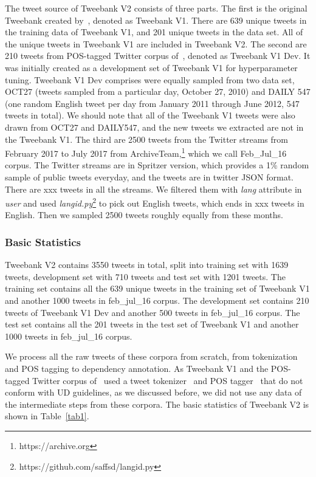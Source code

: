 \documentclass[11pt,letterpaper]{article}
\begin{document}
The tweet source of Tweebank V2 consists of three parts. 
The first is the original Tweebank created by~\cite{kong-EtAl:2014:EMNLP2014}, denoted as Tweebank V1.  There are 639 unique tweets in the training data of Tweebank V1, and 201 unique tweets in the data set. All of the unique tweets in Tweebank V1 are included in Tweebank V2.
The second are 210 tweets from POS-tagged Twitter corpus of~, denoted as Tweebank V1 Dev. It was initially created as a development set of Tweebank V1 for hyperparameter tuning.
Tweebank V1 Dev comprises were equally sampled from two data set, OCT27 (tweets sampled from a particular day, October 27, 2010) and DAILY 547 (one random English tweet per day from January 2011 through June 2012, 547 tweets in total). We should note that all of the Tweebank V1 tweets were also drawn from OCT27 and DAILY547, and the new tweets we extracted are not in the Tweebank V1.
The third are 2500 tweets from the Twitter streams from February 2017 to July 2017 from ArchiveTeam,\footnote{https://archive.org} which we call Feb\_Jul\_16 corpus. The Twitter streams are in Spritzer version, which provides a 1\% random sample of public tweets everyday, and the tweets are in twitter JSON format. 
There are xxx tweets in all the streams. We filtered them with \textit{lang} attribute in \textit{user} and used \textit{langid.py}\footnote{https://github.com/saffsd/langid.py} to pick out English tweets, which ends in xxx tweets in English. Then we sampled 2500 tweets roughly equally from these months.


\subsubsection{Basic Statistics}
Tweebank V2 contains 3550 tweets in total, split into training set with 1639 tweets, development set with 710 tweets and test set with 1201 tweets. 
The training set contains all the 639 unique tweets in the training set of Tweebank V1 and another 1000 tweets in feb\_jul\_16 corpus.
The development set contains 210 tweets of Tweebank V1 Dev and another 500 tweets in feb\_jul\_16 corpus.
The test set contains all the 201 tweets in the test set of Tweebank V1 and another 1000 tweets in feb\_jul\_16 corpus.

We process all the raw tweets of these corpora from scratch, from tokenization and POS tagging to dependency annotation. As Tweebank V1 and the POS-tagged Twitter corpus of~ used a tweet tokenizer~\cite{Krieger10tweetmotif:exploratory} and POS tagger~\cite{Gimpel:2011:PTT:2002736.2002747} that do not conform with UD guidelines, as we discussed before, we did not use any data of the intermediate steps from these corpora. The basic statistics of Tweebank V2 is shown in Table~\ref{tab1}.
\end{document}
